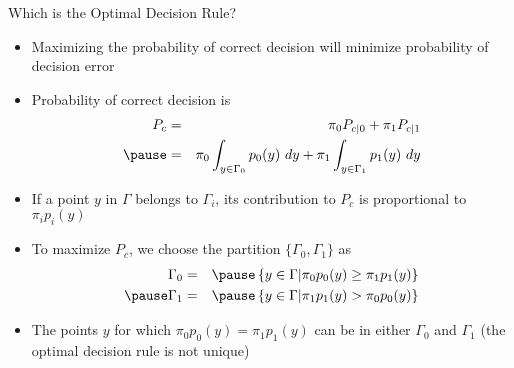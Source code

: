 \documentclass[t]{beamer}
\begin{document}
\begin{frame}{Which is the Optimal Decision Rule?}
  \footnotesize
  \begin{itemize}
    \item Maximizing the probability of correct decision will minimize probability of decision error
    \item \pause Probability of correct decision is
      \begin{eqnarray*}
        P_{c} & = & \pi_0 P_{c|0} + \pi_1 P_{c|1} \\
        \pause
              & = & \pi_0 \int_{y \in \Gamma_0} p_0(y)\ dy + \pi_1 \int_{y \in \Gamma_1} p_1(y) \ dy
      \end{eqnarray*}
    \item \pause If a point $y$ in $\Gamma$ belongs to $\Gamma_i$, its contribution to $P_c$ is proportional to $\pi_i p_i(y)$
    \item \pause To maximize $P_c$, we choose the partition $\{\Gamma_0,\Gamma_1\}$ as
      \begin{eqnarray*}
        \Gamma_0 & = & \pause \left\{y \in \Gamma \lvert \pi_0 p_0(y) \geq \pi_1 p_1(y) \right\} \\
        \pause \Gamma_1 & = & \pause \left\{y \in \Gamma \lvert \pi_1 p_1(y) > \pi_0 p_0(y) \right\} 
      \end{eqnarray*}
    \item \pause The points $y$ for which $ \pi_0 p_0(y) = \pi_1 p_1(y)$ can be in either $\Gamma_0$ and $\Gamma_1$ \pause (the optimal decision rule is not unique)
  \end{itemize}
  \normalsize
\end{frame}
\end{document}
